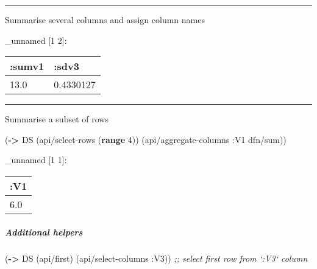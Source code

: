\documentclass[]{article}
\newenvironment{Shaded}{\begin{snugshade}}{\end{snugshade}}
\newcommand{\AttributeTok}[1]{\textcolor[rgb]{0.77,0.63,0.00}{#1}}
\newcommand{\CommentTok}[1]{\textcolor[rgb]{0.56,0.35,0.01}{\textit{#1}}}
\newcommand{\DecValTok}[1]{\textcolor[rgb]{0.00,0.00,0.81}{#1}}
\newcommand{\KeywordTok}[1]{\textcolor[rgb]{0.13,0.29,0.53}{\textbf{#1}}}
\newcommand{\NormalTok}[1]{#1}
\newcommand{\VariableTok}[1]{\textcolor[rgb]{0.00,0.00,0.00}{#1}}
\let\oldsubparagraph\subparagraph
\renewcommand{\subparagraph}[1]{\oldsubparagraph{#1}\mbox{}}
\begin{document}
\begin{center}\rule{0.5\linewidth}{0.5pt}\end{center}

Summarise several columns and assign column names

\begin{Shaded}
\end{Shaded}

\_unnamed {[}1 2{]}:

\begin{longtable}[]{@{}ll@{}}
\toprule
:sumv1 & :sdv3\tabularnewline
\midrule
\endhead
13.0 & 0.4330127\tabularnewline
\bottomrule
\end{longtable}

\begin{center}\rule{0.5\linewidth}{0.5pt}\end{center}

Summarise a subset of rows

\begin{Shaded}
\begin{Highlighting}[]
\NormalTok{(}\KeywordTok{->}\NormalTok{ DS}
\NormalTok{    (api/select-rows (}\KeywordTok{range} \DecValTok{4}\NormalTok{))}
\NormalTok{    (api/aggregate-columns }\AttributeTok{:V1}\NormalTok{ dfn/sum))}
\end{Highlighting}
\end{Shaded}

\_unnamed {[}1 1{]}:

\begin{longtable}[]{@{}l@{}}
\toprule
:V1\tabularnewline
\midrule
\endhead
6.0\tabularnewline
\bottomrule
\end{longtable}

\hypertarget{additional-helpers}{%
\subparagraph{Additional helpers}\label{additional-helpers}}

\begin{Shaded}
\begin{Highlighting}[]
\NormalTok{(}\KeywordTok{->}\NormalTok{ DS}
\NormalTok{    (api/first)}
\NormalTok{    (api/select-columns }\AttributeTok{:V3}\NormalTok{)) }\CommentTok{;; select first row from `:V3` column}
\end{Highlighting}
\end{Shaded}
\end{document}

